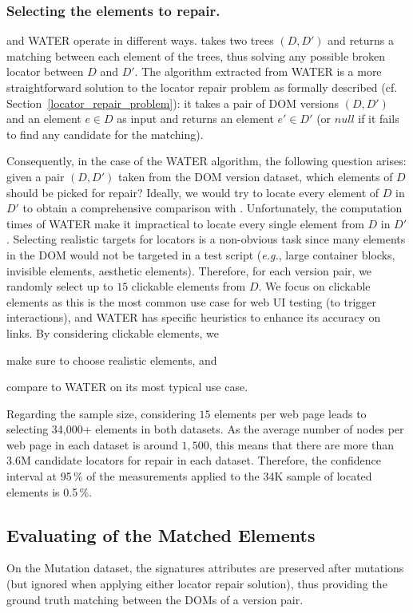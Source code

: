 \subsubsection{Selecting the elements to repair.}
\erratum{} and WATER operate in different ways.
\erratum{} takes two trees $(D, D')$ and returns a matching between each element of the trees, thus solving any possible broken locator between $D$ and $D'$.
The algorithm extracted from WATER is a more straightforward solution to the locator repair problem as formally described (cf. Section~\ref{locator_repair_problem}): it takes a pair of DOM versions $(D,D')$ and an element $e \in D$ as input and returns an element $e' \in D'$ (or $null$ if it fails to find any candidate for the matching).

Consequently, in the case of the WATER algorithm, the following question arises: given a pair $(D, D')$ taken from the DOM version dataset, which elements of $D$ should be picked for repair? 
Ideally, we would try to locate every element of $D$ in $D'$ to obtain a comprehensive comparison with \erratum.
Unfortunately, the computation times of WATER make it impractical to locate every single element from $D$ in $D'$.
Selecting realistic targets for locators is a non-obvious task since many elements in the DOM would not be targeted in a test script (\emph{e.g.}, large container blocks, invisible elements, aesthetic elements).
Therefore, for each version pair, we randomly select up to $15$ clickable elements from $D$.
We focus on clickable elements as this is the most common use case for web UI testing (to trigger interactions), and WATER has specific heuristics to enhance its accuracy on links.
By considering clickable elements, we
\begin{inparaenum}
    \item make sure to choose realistic elements, and
    \item compare to WATER on its most typical use case.
\end{inparaenum}

Regarding the sample size, considering $15$ elements per web page leads to selecting 34,000+ elements in both datasets.
As the average number of nodes per web page in each dataset is around $1,500$, this means that there are more than 3.6M candidate locators for repair in each dataset.
Therefore, the confidence interval at 95\,\% of the measurements applied to the 34K sample of located elements is 0.5\,\%. 

\subsection{Evaluating of the Matched Elements}\label{sec:manualLabeling}
On the {\sc Mutation} dataset, the signatures attributes are preserved after mutations (but ignored when applying either locator repair solution), thus providing the ground truth matching between the DOMs of a version pair.

